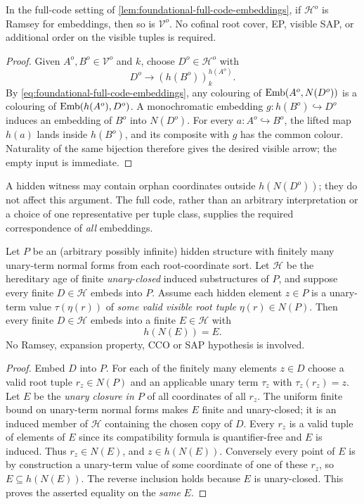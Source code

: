 \begin{theorem}
\label{thm:ramsey-tuple-readout}
In the full-code setting of \cref{lem:foundational-full-code-embeddings},
if $\mathcal H^o$ is Ramsey for embeddings, then so is $\mathcal V^o$.
No cofinal root cover, EP, visible SAP, or additional order on the visible
tuples is required.
\end{theorem}
\begin{proof}
Given $A^o,B^o\in\mathcal V^o$ and $k$, choose $D^o\in\mathcal H^o$ with
\[
                 D^o\longrightarrow(h(B^o))^{h(A^o)}_k.
\]
By \eqref{eq:foundational-full-code-embeddings}, any colouring of
$\operatorname{Emb}(A^o,N(D^o))$ is a colouring of $\operatorname{Emb}(h(A^o),D^o)$.
A monochromatic embedding $g:h(B^o)\hookrightarrow D^o$ induces an
embedding of $B^o$ into $N(D^o)$. For every $a:A^o\hookrightarrow B^o$,
the lifted map $h(a)$ lands inside $h(B^o)$, and its composite with $g$
has the common colour. Naturality of the same bijection therefore gives
the desired visible arrow; the empty input is immediate.
\end{proof}

A hidden witness may contain orphan coordinates outside $h(N(D^o))$;
they do not affect this argument. The full code, rather than an arbitrary
interpretation or a choice of one representative per tuple class, supplies
the required correspondence of \emph{all} embeddings.

\begin{lemma}
\label{lem:foundational-root-cover-cofinal}
Let $P$ be an (arbitrary possibly infinite) hidden
structure with finitely many unary-term normal forms
from each root-coordinate sort. Let $\mathcal H$ be
the hereditary age of finite \emph{unary-closed}
induced substructures of $P$, and suppose every
finite $D\in\mathcal H$ embeds into $P$.
Assume each hidden element $z\in P$ is a unary-term
value $\tau(\eta(r))$ of \emph{some valid visible
root tuple} $\eta(r)\in N(P)$.
Then every finite $D\in\mathcal H$ embeds into a
finite $E\in\mathcal H$ with
\[
                         h(N(E))=E .
\tag{RC}\label{eq:foundational-root-cover}
\]
No Ramsey, expansion property, CCO or SAP hypothesis
is involved.
\end{lemma}
\begin{proof}
Embed $D$ into $P$. For each of the finitely many
elements $z\in D$ choose a valid root tuple
$r_z\in N(P)$ and an applicable unary term $\tau_z$
with $\tau_z(r_z)=z$. Let $E$ be the \emph{unary
closure in $P$} of all coordinates of all $r_z$.
The uniform finite bound on unary-term normal forms
makes $E$ finite and unary-closed; it is an induced
member of $\mathcal H$ containing the chosen copy
of $D$. Every $r_z$ is a valid tuple of elements of
$E$ since its compatibility formula is quantifier-free
and $E$ is induced. Thus $r_z\in N(E)$, and
$z\in h(N(E))$. Conversely every point of $E$ is
by construction a unary-term value of some coordinate
of one of these $r_z$, so
$E\subseteq h(N(E))$. The reverse inclusion
holds because $E$ is unary-closed. This proves
the asserted equality on the \emph{same} $E$.
\end{proof}

